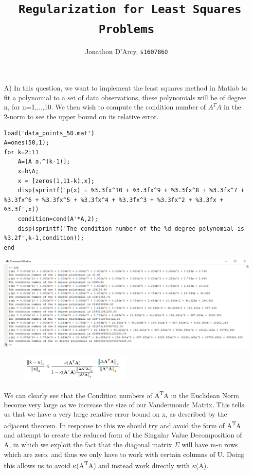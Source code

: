 \documentclass{report}
\title{\texttt{ Regularization for Least Squares Problems}}
\author{Jonathon D'Arcy, \texttt{s1607860}}
\begin{document}
\setlength{\parindent}{25pt}
\maketitle

\clearpage
\noindent A)
\newline \indent In this question, we want to implement the least squares method in Matlab to fit a polynomial to a
set of data observations, these polynomials will be of degree n, for n=1,...,10. We then wish to compute the condition number of $A^{T}A$ in the 2-norm to see the upper bound on its relative error.
\newline


\begin{tcolorbox}
\begin{lstlisting}
load('data_points_50.mat')
A=ones(50,1);
for k=2:11
    A=[A a.^(k-1)];
    x=b\A;
    x = [zeros(1,11-k),x];
    disp(sprintf('p(x) = %3.3fx^10 + %3.3fx^9 + %3.3fx^8 + %3.3fx^7 + %3.3fx^6 + %3.3fx^5 + %3.3fx^4 + %3.3fx^3 + %3.3fx^2 + %3.3fx + %3.3f',x))
    condition=cond(A'*A,2);
    disp(sprintf('The condition number of the %d degree polynomial is %3.2f',k-1,condition));
end
\end{lstlisting}

\begin{center}
\includegraphics[width=\textwidth] {LSQ_Output_1.png}
\end{center}
\end{tcolorbox}
\vspace{1cm}

\begin{figure}
    \centering
    \includegraphics[width=0.5\textwidth]{Error_thrm.png}
\end{figure} 
\noindent We can clearly see that the Condition numbers of A\textsuperscript{T}A in the Euclidean Norm become very large as we increase the size of our Vandermonde Matrix. This tells us that we have a very large relative error bound on x, as described by the adjacent theorem. In response to this we should try and avoid the form of A\textsuperscript{T}A and attempt to create the reduced form of the Singular Value Decomposition of A, in which we exploit the fact that the diagonal matrix $\Sigma$ will have m-n rows which are zero, and thus we only have to work with certain columns of U. Doing this allows us to avoid $\kappa$(A\textsuperscript{T}A) and instead work directly with $\kappa$(A).
 
\end{document}
